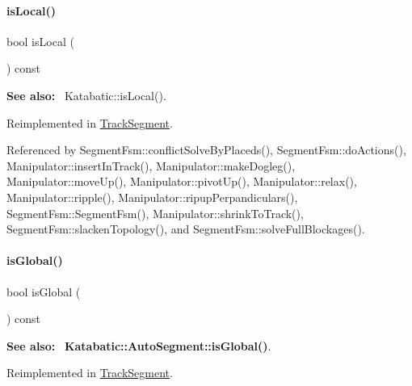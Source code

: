 \mbox{\label{classKite_1_1TrackElement_add556a145a89fdbcea82346abfb873dc}} 
\paragraph{\texorpdfstring{is\+Local()}{isLocal()}}
{\footnotesize\ttfamily bool is\+Local (\begin{DoxyParamCaption}{ }\end{DoxyParamCaption}) const\hspace{0.3cm}{\ttfamily [virtual]}}

{\bfseries See also\+:}~ Katabatic\+::is\+Local(). 

Reimplemented in \mbox{\hyperlink{classKite_1_1TrackSegment_add556a145a89fdbcea82346abfb873dc}{Track\+Segment}}.



Referenced by Segment\+Fsm\+::conflict\+Solve\+By\+Placeds(), Segment\+Fsm\+::do\+Actions(), Manipulator\+::insert\+In\+Track(), Manipulator\+::make\+Dogleg(), Manipulator\+::move\+Up(), Manipulator\+::pivot\+Up(), Manipulator\+::relax(), Manipulator\+::ripple(), Manipulator\+::ripup\+Perpandiculars(), Segment\+Fsm\+::\+Segment\+Fsm(), Manipulator\+::shrink\+To\+Track(), Segment\+Fsm\+::slacken\+Topology(), and Segment\+Fsm\+::solve\+Full\+Blockages().

\mbox{\label{classKite_1_1TrackElement_a19ba379112d6b29faa45c5eefbf38500}} 
\paragraph{\texorpdfstring{is\+Global()}{isGlobal()}}
{\footnotesize\ttfamily bool is\+Global (\begin{DoxyParamCaption}{ }\end{DoxyParamCaption}) const\hspace{0.3cm}{\ttfamily [virtual]}}

{\bfseries See also\+:}~ \textbf{ Katabatic\+::\+Auto\+Segment\+::is\+Global()}. 

Reimplemented in \mbox{\hyperlink{classKite_1_1TrackSegment_a19ba379112d6b29faa45c5eefbf38500}{Track\+Segment}}.



